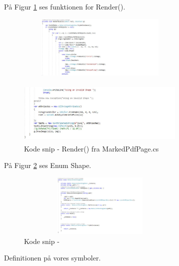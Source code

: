 På Figur \ref{fig:Render} ses funktionen for Render().
\begin{figure}[H] %
	\centering
	\includegraphics[height=3cm, width=8cm]{../ArkitekturDesign/Design/RegisterPDF/Render1}
\end{figure}
\begin{figure}[H] %
	\centering
	\includegraphics[height=3cm, width=8cm]{../ArkitekturDesign/Design/RegisterPDF/Render2}
	\caption{Kode snip - Render() fra MarkedPdfPage.cs}
	\label{fig:Render}
\end{figure}

På Figur \ref{fig:Singleton} ses Enum Shape.
\begin{figure}[H] %
	\centering
	\includegraphics[height=3cm, width=8cm]{../ArkitekturDesign/Design/RegisterPDF/Singleton}
	\caption{Kode snip - }
	\label{fig:Singleton}
\end{figure}
Definitionen på vores symboler.

